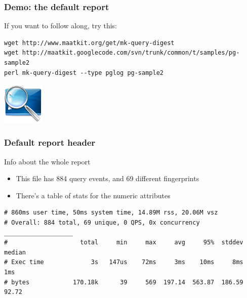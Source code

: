 \begin{frame}[fragile]
   \frametitle{Demo: the default report}

   If you want to follow along, try this:

   \scriptsize

\begin{verbatim}
wget http://www.maatkit.org/get/mk-query-digest
wget http://maatkit.googlecode.com/svn/trunk/common/t/samples/pg-sample2
perl mk-query-digest --type pglog pg-sample2
\end{verbatim}

   \normalsize

   \includegraphics[width=20mm]{../image/demo}
\end{frame}

\begin{frame}[fragile]
\frametitle{Default report header}
\begin{block}{Info about the whole report}
\begin{itemize}
   \item This file has 884 query events, and 69 different fingerprints
   \item There's a table of stats for the numeric attributes
\end{itemize}
\end{block}
\scriptsize
\begin{verbatim}
# 860ms user time, 50ms system time, 14.89M rss, 20.06M vsz
# Overall: 884 total, 69 unique, 0 QPS, 0x concurrency ___________________
#                    total     min     max     avg     95%  stddev  median
# Exec time             3s   147us    72ms     3ms    10ms     8ms     1ms
# bytes            170.18k      39     569  197.14  563.87  186.59   92.72
\end{verbatim}
\normalsize
\end{frame}

